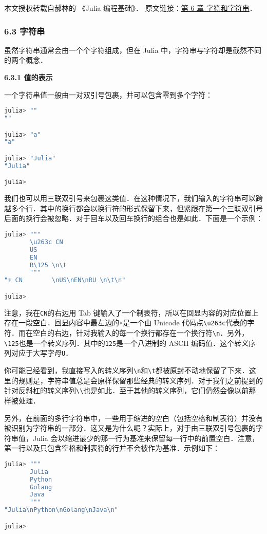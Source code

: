 
本文授权转载自郝林的 《Julia 编程基础》． 原文链接：\href{https://github.com/hyper0x/JuliaBasics/blob/master/book/ch06.md}{第 6 章 字符和字符串}．


\subsubsection{6.3 字符串}

虽然字符串通常会由一个个字符组成，但在 Julia 中，字符串与字符却是截然不同的两个概念．

\textbf{6.3.1 值的表示}

一个字符串值一般由一对双引号包裹，并可以包含零到多个字符：
\begin{lstlisting}[language=julia]
julia> ""
""

julia> "a"
"a"

julia> "Julia"
"Julia"

julia> 
\end{lstlisting}

我们也可以用三联双引号来包裹这类值．在这种情况下，我们输入的字符串可以跨越多个行．其中的换行都会以换行符的形式保留下来，但紧跟在第一个三联双引号后面的换行会被忽略．对于回车以及回车换行的组合也是如此．下面是一个示例：
\begin{lstlisting}[language=julia]
julia> """
       \u263c CN        
       US
       EN
       R\125 \n\t
       """
"☼ CN        \nUS\nEN\nRU \n\t\n"

julia> 
\end{lstlisting}

注意，我在\verb|CN|的右边用 Tab 键输入了一个制表符，所以在回显内容的对应位置上存在一段空白．回显内容中最左边的\verb|☼|是一个由 Unicode 代码点\verb|\u263c|代表的字符．而在空白的右边，针对我输入的每一个换行都存在一个换行符\verb|\n|．另外，\verb|\125|也是一个转义序列．其中的\verb|125|是一个八进制的 ASCII 编码值．这个转义序列对应于大写字母\verb|U|．

你可能已经看到，我直接写入的转义序列\verb|\n|和\verb|\t|都被原封不动地保留了下来．这里的规则是，字符串值总是会原样保留那些经典的转义序列．对于我们之前提到的针对反斜杠的转义序列\verb|\\|也是如此．至于其他的转义序列，它们仍然会像以前那样被处理．

另外，在前面的多行字符串中，一些用于缩进的空白（包括空格和制表符）并没有被识别为字符串的一部分．这又是为什么呢？实际上，对于由三联双引号包裹的字符串值，Julia 会以缩进最少的那一行为基准来保留每一行中的前置空白．注意，第一行以及只包含空格和制表符的行并不会被作为基准．示例如下：
\begin{lstlisting}[language=julia]
julia> """
       Julia
       Python
       Golang
       Java
       """
"Julia\nPython\nGolang\nJava\n"

julia> 
\end{lstlisting}

